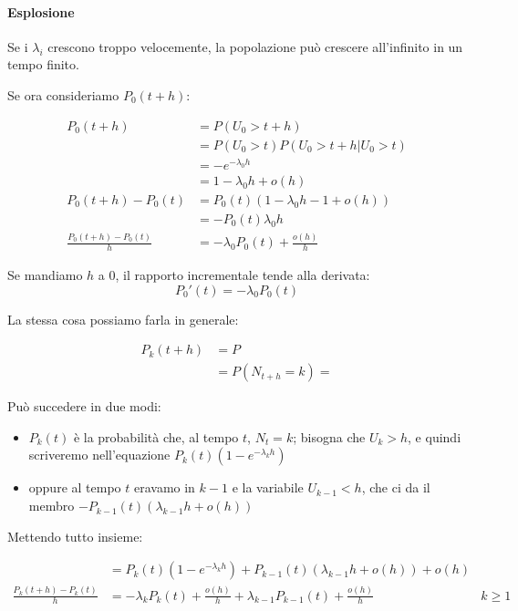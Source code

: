 \documentclass[a4paper,12pt]{book}
\begin{document}
\paragraph{Esplosione} Se i $\lambda_{i}$ crescono troppo velocemente, la popolazione può crescere all'infinito in un tempo finito. 

Se ora consideriamo $ P_0(t+h) $:
 
 \begin{align*}
 	P_0(t+h) & = P(U_0 > t+h) \\
 	& = P(U_0 > t) P(U_0 > t+h | U_0 > t) \\
 	& = -e^{-\lambda_0 h} \\
 	& = 1 - \lambda_0 h + o(h) \\
 	P_0(t+h) - P_0(t) & = P_0(t)(1 - \lambda_0 h - 1 + o(h)) \\
 	& = -P_0(t)\lambda_0 h \\
 	\frac{P_0(t+h) -P_0(t)}{h} & = -\lambda_0 P_0(t) +\frac{o(h)}{h}
 \end{align*}
 
 Se mandiamo $ h $ a 0, il rapporto incrementale tende alla derivata:
 $$ P_0'(t) = -\lambda_0 P_0(t) $$

La stessa cosa possiamo farla in generale:

\begin{align*}
	P_k(t+h) & = P \\
	& = P(N_{t+h} = k) =
\end{align*}

Può succedere in due modi:
\begin{itemize}
	\item $ P_k(t) $ è la probabilità che, al tempo $t$, $ N_t = k $; bisogna che $ U_k > h $, e quindi scriveremo nell'equazione $ P_k(t)(1 - e^{-\lambda_k h}) $
	\item oppure al tempo $ t $ eravamo in $ k-1 $ e la variabile $ U_{k-1} < h $, che ci da il membro $ - P_{k-1}(t) (\lambda_{k-1} h + o(h) ) $

\end{itemize} 

Mettendo tutto insieme:

\begin{align*}
	& = P_k(t)(1 - e^{-\lambda_k h}) + P_{k-1}(t) (\lambda_{k-1} h + o(h) ) + o(h) \\
	\frac{	P_k(t+h) - P_k (t)}{h} & = -\lambda_k P_k(t) + \frac{o(h)}{h} + \lambda_{k-1}P_{k-1}(t) + \frac{o(h)}{h} & k \ge 1
\end{align*}
\end{document}
